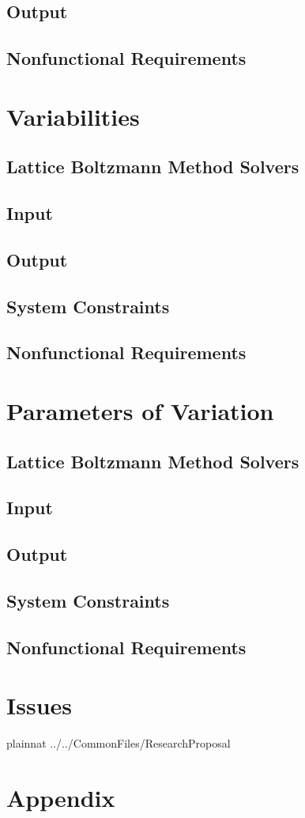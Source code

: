 \documentclass[12pt]{article}
\begin{document}
\subsection{Output}
\subsection{Nonfunctional Requirements}
\newpage
\section{Variabilities}
\subsection{Lattice Boltzmann Method Solvers}
\subsection{Input}
\subsection{Output}
\subsection{System Constraints}
\subsection{Nonfunctional Requirements}
\newpage
\section{Parameters of Variation}
\subsection{Lattice Boltzmann Method Solvers}
\subsection{Input}
\subsection{Output}
\subsection{System Constraints}
\subsection{Nonfunctional Requirements}
\newpage
\section{Issues}
\newpage
 {plainnat}
 {../../CommonFiles/ResearchProposal}
\newpage
\section{Appendix}
\end{document}
